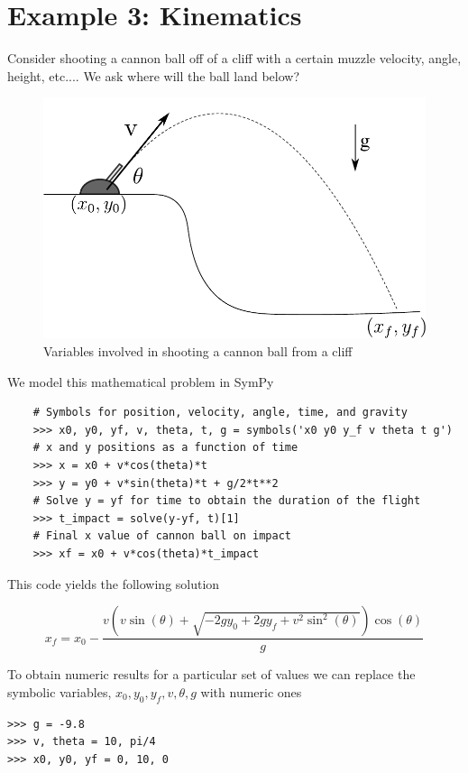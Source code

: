 \section{Example 3: Kinematics}

Consider shooting a cannon ball off of a cliff with a certain muzzle velocity, angle, height, etc.... We ask where will the ball land below?

\begin{figure}[ht]
\vspace{-0pt}
\centering
\includegraphics[width=.55\textwidth]{images/kinematics}
\vspace{-0pt}
\caption{Variables involved in shooting a cannon ball from a cliff}
\label{fig:kinematics}
\vspace{00pt}
\end{figure}
We model this mathematical problem in SymPy

\begin{lstlisting}
    # Symbols for position, velocity, angle, time, and gravity
    >>> x0, y0, yf, v, theta, t, g = symbols('x0 y0 y_f v theta t g') 
    # x and y positions as a function of time
    >>> x = x0 + v*cos(theta)*t
    >>> y = y0 + v*sin(theta)*t + g/2*t**2
    # Solve y = yf for time to obtain the duration of the flight
    >>> t_impact = solve(y-yf, t)[1]
    # Final x value of cannon ball on impact
    >>> xf = x0 + v*cos(theta)*t_impact
\end{lstlisting}
This code yields the following solution

\begin{equation}
\label{eqn:kinematics_symbolic}
x_f = x_{0} - \frac{v \left(v \sin{\left (\theta \right )} + \sqrt{- 2 g y_{0} + 2 g y_f + v^{2} \sin^{2}{\left (\theta \right )}}\right) \cos{\left (\theta \right )}}{g}
\end{equation}

To obtain numeric results for a particular set of values we can replace the symbolic variables, $x_0, y_0, y_f, v, \theta, g$ with numeric ones

\begin{lstlisting}
>>> g = -9.8
>>> v, theta = 10, pi/4
>>> x0, y0, yf = 0, 10, 0
\end{lstlisting}

